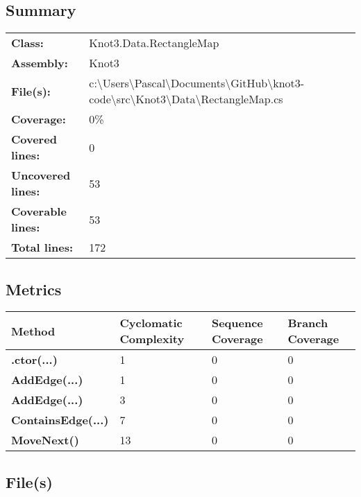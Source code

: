 \documentclass[a4paper,10pt]{article}
\begin{document}
\subsection{Summary}
\begin{longtable}[l]{ll}
\textbf{Class:} & Knot3.Data.RectangleMap\\
\textbf{Assembly:} & Knot3\\
\textbf{File(s):} & \begin{minipage}[t]{12cm}{c:\textbackslash Users\textbackslash Pascal\textbackslash Documents\textbackslash GitHub\textbackslash knot3-code\textbackslash src\textbackslash Knot3\textbackslash Data\textbackslash RectangleMap.cs}\end{minipage} \\
\textbf{Coverage:} & 0\%\\
\textbf{Covered lines:} & 0\\
\textbf{Uncovered lines:} & 53\\
\textbf{Coverable lines:} & 53\\
\textbf{Total lines:} & 172\\
\end{longtable}
\subsection{Metrics}
\begin{longtable}[l]{|l|l|l|l|}
\hline
\textbf{Method} & \textbf{Cyclomatic Complexity} & \textbf{Sequence Coverage} & \textbf{Branch Coverage}\\
\hline
\textbf{.ctor(...)} & 1 & 0 & 0\\
\hline
\textbf{AddEdge(...)} & 1 & 0 & 0\\
\hline
\textbf{AddEdge(...)} & 3 & 0 & 0\\
\hline
\textbf{ContainsEdge(...)} & 7 & 0 & 0\\
\hline
\textbf{MoveNext()} & 13 & 0 & 0\\
\hline
\end{longtable}
\subsection{File(s)}
\end{document}
